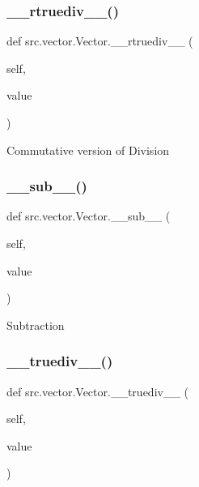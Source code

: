 \subsubsection{\texorpdfstring{\+\_\+\+\_\+rtruediv\+\_\+\+\_\+()}{\_\_rtruediv\_\_()}}
{\footnotesize\ttfamily def src.\+vector.\+Vector.\+\_\+\+\_\+rtruediv\+\_\+\+\_\+ (\begin{DoxyParamCaption}\item[{}]{self,  }\item[{}]{value }\end{DoxyParamCaption})}

\begin{DoxyVerb}Commutative version of Division\end{DoxyVerb}
 \mbox{\label{classsrc_1_1vector_1_1Vector_a842a13149bd1e22adc486daab3b08cdc}} 
\subsubsection{\texorpdfstring{\+\_\+\+\_\+sub\+\_\+\+\_\+()}{\_\_sub\_\_()}}
{\footnotesize\ttfamily def src.\+vector.\+Vector.\+\_\+\+\_\+sub\+\_\+\+\_\+ (\begin{DoxyParamCaption}\item[{}]{self,  }\item[{}]{value }\end{DoxyParamCaption})}

\begin{DoxyVerb}Subtraction\end{DoxyVerb}
 \mbox{\label{classsrc_1_1vector_1_1Vector_ad8a51ed8ec4efbec47db53f9cbc4f33c}} 
\subsubsection{\texorpdfstring{\+\_\+\+\_\+truediv\+\_\+\+\_\+()}{\_\_truediv\_\_()}}
{\footnotesize\ttfamily def src.\+vector.\+Vector.\+\_\+\+\_\+truediv\+\_\+\+\_\+ (\begin{DoxyParamCaption}\item[{}]{self,  }\item[{}]{value }\end{DoxyParamCaption})}

